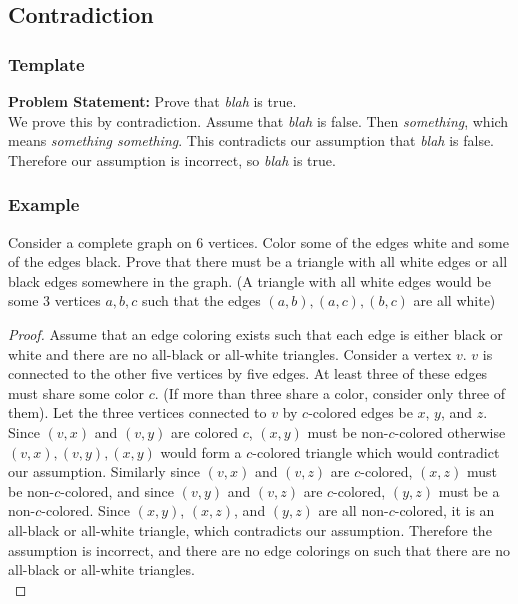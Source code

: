 \documentclass[12pt]{article}
\begin{document}
\subsection{Contradiction}
\subsubsection{Template}
\textbf{Problem Statement:} Prove that \emph{blah} is true.\\

We prove this by contradiction. Assume that \emph{blah} is false. Then \emph{something}, which means \emph{something something}. This contradicts our assumption that \emph{blah} is false. Therefore our assumption is incorrect, so \emph{blah} is true.

\subsubsection{Example}
Consider a complete graph on 6 vertices. Color some of the edges white and some of the edges black. Prove that there must be a triangle with all white edges or all black edges somewhere in the graph. (A triangle with all white edges would be some 3 vertices $a,b,c$ such that the edges $(a,b), (a,c), (b,c)$ are all white)
\begin{proof}
Assume that an edge coloring exists such that each edge is either black or white and there are no all-black or all-white triangles. Consider a vertex $v$. $v$ is connected to the other five vertices by five edges. At least three of these edges must share some color $c$. (If more than three share a color, consider only three of them). Let the three vertices connected to $v$ by $c$-colored edges be $x$, $y$, and $z$. Since $(v,x)$ and $(v,y)$ are colored $c$, $(x,y)$ must be non-$c$-colored otherwise $(v,x), (v,y), (x,y)$ would form a $c$-colored triangle which would contradict our assumption. Similarly since $(v,x)$ and $(v,z)$ are $c$-colored, $(x,z)$ must be non-$c$-colored, and since $(v,y)$ and $(v,z)$ are $c$-colored, $(y,z)$ must be a non-$c$-colored. Since $(x,y)$, $(x,z)$, and $(y,z)$ are all non-$c$-colored, it is an all-black or all-white triangle, which contradicts our assumption. Therefore the assumption is incorrect, and there are no edge colorings on such that there are no all-black or all-white triangles.\\
\end{proof}
\end{document}
